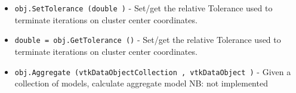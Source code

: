 \begin{itemize}
\item  \verb|obj.SetTolerance (double )| -  Set/get the relative  Tolerance used to terminate iterations on
 cluster center coordinates.

\item  \verb|double = obj.GetTolerance ()| -  Set/get the relative  Tolerance used to terminate iterations on
 cluster center coordinates.

\item  \verb|obj.Aggregate (vtkDataObjectCollection , vtkDataObject )| -  Given a collection of models, calculate aggregate model
 NB: not implemented

\end{itemize}
